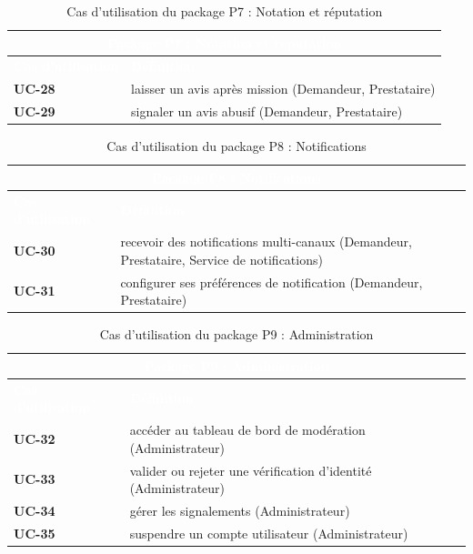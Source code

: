 \begin{table}[H]
	\caption{Cas d'utilisation du package P7 : Notation et réputation}
	\label{tab:cu_p7}
	\centering
	\begin{tabular}{|p{3cm}|p{10.5cm}|}
		\hline
		\multicolumn{2}{|c|}{\cellcolor{vertCongo}\textcolor{white}{\textbf{Package P7 : Notation et réputation}}} \\
		\hline
		\rowcolor{vertCongo}
		\textcolor{white}{\textbf{Cas d'utilisation}} & \textcolor{white}{\textbf{Définition}} \\
		\hline
		\textbf{UC-28} & laisser un avis après mission (Demandeur, Prestataire) \\
		\hline
		\textbf{UC-29} & signaler un avis abusif (Demandeur, Prestataire) \\
		\hline
	\end{tabular}
\end{table}

\begin{table}[H]
	\caption{Cas d'utilisation du package P8 : Notifications}
	\label{tab:cu_p8}
	\centering
	\begin{tabular}{|p{3cm}|p{10.5cm}|}
		\hline
		\multicolumn{2}{|c|}{\cellcolor{vertCongo}\textcolor{white}{\textbf{Package P8 : Notifications}}} \\
		\hline
		\rowcolor{vertCongo}
		\textcolor{white}{\textbf{Cas d'utilisation}} & \textcolor{white}{\textbf{Définition}} \\
		\hline
		\textbf{UC-30} & recevoir des notifications multi-canaux (Demandeur, Prestataire, Service de notifications) \\
		\hline
		\textbf{UC-31} & configurer ses préférences de notification (Demandeur, Prestataire) \\
		\hline
	\end{tabular}
\end{table}

\begin{table}[H]
	\caption{Cas d'utilisation du package P9 : Administration}
	\label{tab:cu_p9}
	\centering
	\begin{tabular}{|p{3cm}|p{10.5cm}|}
		\hline
		\multicolumn{2}{|c|}{\cellcolor{vertCongo}\textcolor{white}{\textbf{Package P9 : Administration}}} \\
		\hline
		\rowcolor{vertCongo}
		\textcolor{white}{\textbf{Cas d'utilisation}} & \textcolor{white}{\textbf{Définition}} \\
		\hline
		\textbf{UC-32} & accéder au tableau de bord de modération (Administrateur) \\
		\hline
		\textbf{UC-33} & valider ou rejeter une vérification d'identité (Administrateur) \\
		\hline
		\textbf{UC-34} & gérer les signalements (Administrateur) \\
		\hline
		\textbf{UC-35} & suspendre un compte utilisateur (Administrateur) \\
		\hline
	\end{tabular}
\end{table}

